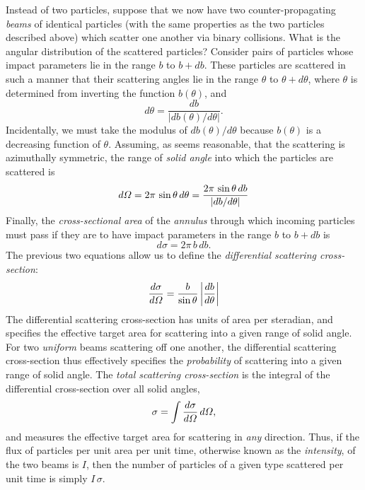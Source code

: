 Instead of two particles, suppose that we now have  two counter-propag\-ating {\em beams}\/ of  identical particles (with the same properties as the
two particles described above) which scatter one another via binary collisions. What
is the angular distribution of the scattered particles?
Consider pairs of particles whose impact parameters lie in the range $b$ to $b+db$. These particles are scattered in such a manner that their scattering
angles lie in the range $\theta$ to $\theta+d\theta$, where $\theta$
is determined from inverting the function $b(\theta)$, and
\begin{equation}
d\theta = \frac{db}{|db(\theta)/d\theta|}.
\end{equation}
Incidentally, we must take the modulus of $db(\theta)/d\theta$ because $b(\theta)$ is
a decreasing function of $\theta$. Assuming, as seems reasonable, that the scattering
is azimuthally symmetric, the range of {\em solid angle}\/ into which
the particles are scattered is
\begin{equation}
d{\mit\Omega} = 2\pi\,\sin\theta\,d\theta = \frac{2\pi\,\sin\theta\,db}{|db/d\theta|}
\end{equation}
Finally, the {\em cross-sectional area}\/ of the {\em annulus}\/ through which incoming
particles must pass if they are to have impact parameters in the
range $b$ to $b+db$ is
\begin{equation}
d\sigma = 2\pi\,b\,db.
\end{equation}
The previous two equations allow us to define the {\em differential scattering
cross-section}:
\begin{equation}\label{e7.29}
\frac{d\sigma}{d{\mit\Omega}} = \frac{b}{\sin\theta}\left|\frac{db}{d\theta}\right|
\end{equation}
The differential scattering cross-section has units of area per steradian,
and specifies the effective target area for scattering into a given
range of solid angle. For two {\em uniform}\/ beams scattering
off one another, the differential scattering cross-section thus 
effectively specifies the {\em probability}\/ of scattering into a given range of
solid angle. The {\em total scattering cross-section}\/ is the integral
of the differential cross-section over all solid angles,
\begin{equation}
\sigma = \int \frac{d\sigma}{d{\mit\Omega}}\,d{\mit\Omega},\label{e7.29a}
\end{equation}
and measures the effective target area for scattering in {\em any}\/ direction. 
Thus, if the flux of particles per unit area per unit time, otherwise known as the {\em intensity}, of the two beams is $I$, then the number of particles of a given type scattered
per unit time is simply $I\,\sigma$. 

